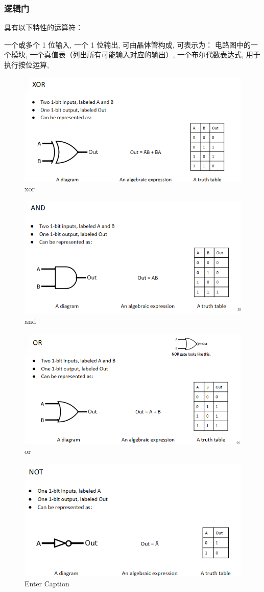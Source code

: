 \documentclass{ctexart}
\begin{document}
\subsubsection{逻辑门}
具有以下特性的运算符：\par
一个或多个 1 位输入,
一个 1 位输出,
可由晶体管构成,
可表示为：
电路图中的一个模块,
一个真值表（列出所有可能输入对应的输出）,
一个布尔代数表达式,
用于执行按位运算,
\begin{figure}
    \centering
    \includegraphics[width=0.5\linewidth]{xor.png}
    \caption{xor}
    \label{fig:enter-label}
\end{figure}
\begin{figure}
    \centering
    \includegraphics[width=0.5\linewidth]{and.png}
    \caption{and}
    \label{fig:enter-label}
\end{figure}
\begin{figure}
    \centering
    \includegraphics[width=0.5\linewidth]{or.png}
    \caption{or}
    \label{fig:enter-label}
\end{figure}
\begin{figure}
    \centering
    \includegraphics[width=0.5\linewidth]{not.png}
    \caption{Enter Caption}
    \label{fig:enter-label}
\end{figure}
\end{document}
